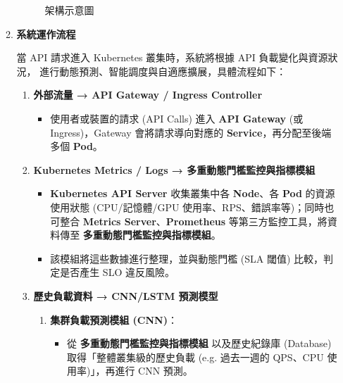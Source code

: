\documentclass[12pt,a4paper]{article}
\begin{document}
\begin{enumerate}[label={(\zhdig*)}, leftmargin=2\parindent, listparindent=\parindent]
\begin{enumerate}[label={(\arabic*)}, leftmargin=\parindent, listparindent=\parindent]
\begin{figure} [htbp]
    \caption{架構示意圖}

\end{figure}\newpage

    \item \textbf{
系統運作流程}

當 API 請求進入 Kubernetes 叢集時，系統將根據 API 負載變化與資源狀況，
進行動態預測、智能調度與自適應擴展，具體流程如下：
\begin{enumerate}[label={(\zhdig*)}, leftmargin=\parindent, listparindent=\parindent]

\item \textbf{外部流量 → API Gateway / Ingress Controller}\textbf{}
    \begin{itemize}[leftmargin=\parindent, listparindent=\parindent]

        \item 使用者或裝置的請求 (API Calls) 進入 \textbf{API Gateway} (或 Ingress)，Gateway 會將請求導向對應的 \textbf{Service}，再分配至後端多個 \textbf{Pod}。
    \end{itemize}
\item \textbf{Kubernetes Metrics / Logs → 多重動態門檻監控與指標模組}\textbf{}
    \begin{itemize}[leftmargin=\parindent, listparindent=\parindent]

        \item \textbf{Kubernetes API Server} 收集叢集中各 \textbf{Node}、各 \textbf{Pod} 的資源使用狀態 (CPU/記憶體/GPU 使用率、RPS、錯誤率等)；同時也可整合 \textbf{Metrics Server}、\textbf{Prometheus} 等第三方監控工具，將資料傳至 \textbf{多重動態門檻監控與指標模組}。

        \item 該模組將這些數據進行整理，並與動態門檻 (SLA 閾值) 比較，判定是否產生 SLO 違反風險。
    \end{itemize}
\item \textbf{歷史負載資料 → CNN/LSTM 預測模型}\textbf{}
    \begin{enumerate}[label={(\arabic*)}, leftmargin=\parindent, listparindent=\parindent]

        \item \textbf{集群負載預測模組 (CNN)}：
        \begin{itemize}[leftmargin=\parindent, listparindent=\parindent]
            \item 從 \textbf{多重動態門檻監控與指標模組} 以及歷史紀錄庫 (Database) 取得「整體叢集級的歷史負載 (e.g. 過去一週的 QPS、CPU 使用率)」，再進行 CNN 預測。


\end{itemize}
\end{enumerate}
\end{enumerate}
\end{enumerate}
\end{enumerate}
\end{document}
